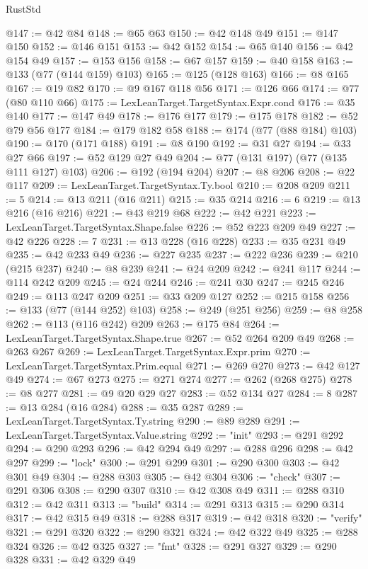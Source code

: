 \begin{lexlean}{RustStd}
\begin{coremodule}
@147 := @42 @84
@148 := @65 @63
@150 := @42 @148 @49
@151 := @147 @150
@152 := @146 @151
@153 := @42 @152
@154 := @65 @140
@156 := @42 @154 @49
@157 := @153 @156
@158 := @67 @157
@159 := @40 @158
@163 := @133 (@77 (@144 @159) @103)
@165 := @125 (@128 @163)
@166 := @8 @165
@167 := @19 @82
@170 := @9 @167 @118 @56
@171 := @126 @66
@174 := @77 (@80 @110 @66)
@175 := LexLeanTarget.TargetSyntax.Expr.cond
@176 := @35 @140
@177 := @147 @49
@178 := @176 @177
@179 := @175 @178
@182 := @52 @79 @56 @177
@184 := @179 @182 @58
@188 := @174 (@77 (@88 @184) @103)
@190 := @170 (@171 @188)
@191 := @8 @190
@192 := @31 @27
@194 := @33 @27 @66
@197 := @52 @129 @27 @49
@204 := @77 (@131 @197) (@77 (@135 @111 @127) @103)
@206 := @192 (@194 @204)
@207 := @8 @206
@208 := @22 @117
@209 := LexLeanTarget.TargetSyntax.Ty.bool
@210 := @208 @209
@211 := 5
@214 := @13 @211 (@16 @211)
@215 := @35 @214
@216 := 6
@219 := @13 @216 (@16 @216)
@221 := @43 @219 @68
@222 := @42 @221
@223 := LexLeanTarget.TargetSyntax.Shape.false
@226 := @52 @223 @209 @49
@227 := @42 @226
@228 := 7
@231 := @13 @228 (@16 @228)
@233 := @35 @231 @49
@235 := @42 @233 @49
@236 := @227 @235
@237 := @222 @236
@239 := @210 (@215 @237)
@240 := @8 @239
@241 := @24 @209
@242 := @241 @117
@244 := @114 @242 @209
@245 := @24 @244
@246 := @241 @30
@247 := @245 @246
@249 := @113 @247 @209
@251 := @33 @209 @127
@252 := @215 @158
@256 := @133 (@77 (@144 @252) @103)
@258 := @249 (@251 @256)
@259 := @8 @258
@262 := @113 (@116 @242) @209
@263 := @175 @84
@264 := LexLeanTarget.TargetSyntax.Shape.true
@267 := @52 @264 @209 @49
@268 := @263 @267
@269 := LexLeanTarget.TargetSyntax.Expr.prim
@270 := LexLeanTarget.TargetSyntax.Prim.equal
@271 := @269 @270
@273 := @42 @127 @49
@274 := @67 @273
@275 := @271 @274
@277 := @262 (@268 @275)
@278 := @8 @277
@281 := @9 @20 @29 @27
@283 := @52 @134 @27
@284 := 8
@287 := @13 @284 (@16 @284)
@288 := @35 @287
@289 := LexLeanTarget.TargetSyntax.Ty.string
@290 := @89 @289
@291 := LexLeanTarget.TargetSyntax.Value.string
@292 := "init"
@293 := @291 @292
@294 := @290 @293
@296 := @42 @294 @49
@297 := @288 @296
@298 := @42 @297
@299 := "lock"
@300 := @291 @299
@301 := @290 @300
@303 := @42 @301 @49
@304 := @288 @303
@305 := @42 @304
@306 := "check"
@307 := @291 @306
@308 := @290 @307
@310 := @42 @308 @49
@311 := @288 @310
@312 := @42 @311
@313 := "build"
@314 := @291 @313
@315 := @290 @314
@317 := @42 @315 @49
@318 := @288 @317
@319 := @42 @318
@320 := "verify"
@321 := @291 @320
@322 := @290 @321
@324 := @42 @322 @49
@325 := @288 @324
@326 := @42 @325
@327 := "fmt"
@328 := @291 @327
@329 := @290 @328
@331 := @42 @329 @49

\end{coremodule}
\end{lexlean}
